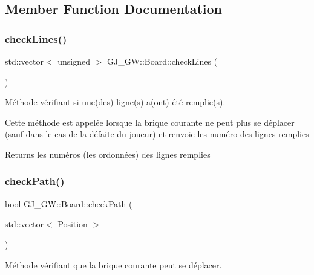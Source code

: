 \subsection{Member Function Documentation}
\hypertarget{class_g_j___g_w_1_1_board_aa613553d159cdf49805a7f083381f038}{}\label{class_g_j___g_w_1_1_board_aa613553d159cdf49805a7f083381f038} 
\subsubsection{\texorpdfstring{check\+Lines()}{checkLines()}}
{\footnotesize\ttfamily std\+::vector$<$ unsigned $>$ G\+J\+\_\+\+G\+W\+::\+Board\+::check\+Lines (\begin{DoxyParamCaption}{ }\end{DoxyParamCaption})}



Méthode vérifiant si une(des) ligne(s) a(ont) été remplie(s). 

Cette méthode est appelée lorsque la brique courante ne peut plus se déplacer (sauf dans le cas de la défaite du joueur) et renvoie les numéro des lignes remplies

\begin{DoxyReturn}{Returns}
les numéros (les ordonnées) des lignes remplies 
\end{DoxyReturn}
\hypertarget{class_g_j___g_w_1_1_board_ab8cf3ac1607e01c772e0637b7fa34da7}{}\label{class_g_j___g_w_1_1_board_ab8cf3ac1607e01c772e0637b7fa34da7} 
\subsubsection{\texorpdfstring{check\+Path()}{checkPath()}}
{\footnotesize\ttfamily bool G\+J\+\_\+\+G\+W\+::\+Board\+::check\+Path (\begin{DoxyParamCaption}\item[{std\+::vector$<$ \hyperlink{class_g_j___g_w_1_1_position}{Position} $>$}]{ }\end{DoxyParamCaption})}



Méthode vérifiant que la brique courante peut se déplacer. 

